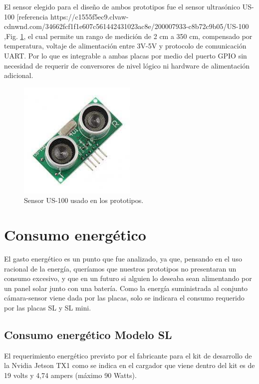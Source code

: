 El sensor elegido para el diseño de ambos prototipos fue el sensor ultrasónico US-100 [referencia https://c1555f5ec9.clvaw-cdnwnd.com/34662fcf1f1e607c561442431023ac8e/200007933-c8b72c9b05/US-100%
,Fig. \ref{fig:sensor-US100}, el cual permite un 
rango de medición de 2 cm a 350 cm, compensado por temperatura, voltaje de alimentación entre 3V-5V y protocolo de 
comunicación UART. Por lo que es integrable a ambas placas por medio del puerto GPIO sin necesidad de requerir de conversores de nivel lógico 
ni hardware de alimentación adicional.
\begin{figure}
    \centering
    \includegraphics[width=0.5\textwidth]{imgs/us-100.jpg}
    \caption{Sensor US-100 usado en los prototipos.}
    \label{fig:sensor-US100}
\end{figure}

\section{Consumo energético}

El gasto energético es un punto que fue analizado, ya que, pensando en el uso racional de la energía, queríamos que nuestros prototipos no
presentaran un consumo excesivo, y que en un futuro si alguien lo deseaba sean alimentando por un panel solar junto con una batería.
Como la energía suministrada al conjunto cámara-sensor viene dada por las placas, solo se indicara el consumo requerido por las placas SL y SL mini.
\subsection{Consumo energético Modelo SL}

El requerimiento energético previsto por el fabricante para el kit de desarrollo de la Nvidia Jetson TX1 como se indica 
en el cargador que viene dentro del kit es de 19 volts y 4,74 ampers (máximo 90 Watts).

